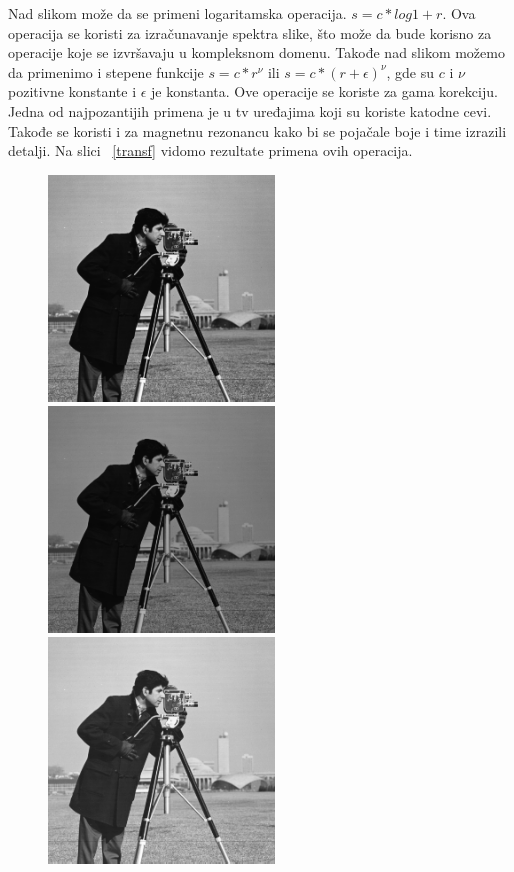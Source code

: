 \documentclass[a4paper,12pt,titlepage]{article}
\begin{document}
Nad slikom može da se primeni logaritamska operacija. $s = c*log{1+ r}$. Ova operacija se koristi za izračunavanje spektra slike, što može da bude korisno za operacije koje se izvršavaju u kompleksnom domenu. Takođe nad slikom možemo da primenimo i stepene funkcije $s = c*r^{\nu}$ ili $s = c*(r + \epsilon)^{\nu}$, gde su $c$ i $\nu$ pozitivne konstante i $\epsilon$ je konstanta. Ove operacije se koriste za gama korekciju. Jedna od najpozantijih primena je u tv uređajima koji su koriste katodne cevi. Takođe se koristi i za magnetnu rezonancu kako bi se pojačale boje i time izrazili detalji. Na slici ~\ref{transf} vidomo rezultate primena ovih operacija.

\begin{figure}[ht!]
\centering
\includegraphics[width=60mm]{img/img.png}
\includegraphics[width=60mm]{img/imgLog.png}
\includegraphics[width=60mm]{img/imgPow1.png}

\end{figure}
\end{document}
